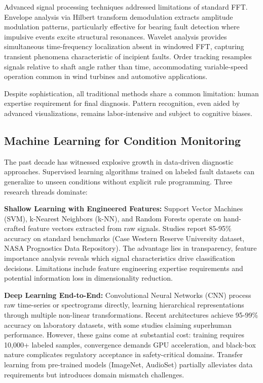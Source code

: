 \documentclass[11pt,a4paper]{article}
\begin{document}
Advanced signal processing techniques addressed limitations of standard FFT. Envelope analysis via Hilbert transform demodulation extracts amplitude modulation patterns, particularly effective for bearing fault detection where impulsive events excite structural resonances. Wavelet analysis provides simultaneous time-frequency localization absent in windowed FFT, capturing transient phenomena characteristic of incipient faults. Order tracking resamples signals relative to shaft angle rather than time, accommodating variable-speed operation common in wind turbines and automotive applications.

Despite sophistication, all traditional methods share a common limitation: human expertise requirement for final diagnosis. Pattern recognition, even aided by advanced visualizations, remains labor-intensive and subject to cognitive biases.

\subsection{Machine Learning for Condition Monitoring}

The past decade has witnessed explosive growth in data-driven diagnostic approaches. Supervised learning algorithms trained on labeled fault datasets can generalize to unseen conditions without explicit rule programming. Three research threads dominate:

\textbf{Shallow Learning with Engineered Features:} Support Vector Machines (SVM), k-Nearest Neighbors (k-NN), and Random Forests operate on hand-crafted feature vectors extracted from raw signals. Studies report 85-95\% accuracy on standard benchmarks (Case Western Reserve University dataset, NASA Prognostics Data Repository). The advantage lies in transparency, feature importance analysis reveals which signal characteristics drive classification decisions. Limitations include feature engineering expertise requirements and potential information loss in dimensionality reduction.

\textbf{Deep Learning End-to-End:} Convolutional Neural Networks (CNN) process raw time-series or spectrograms directly, learning hierarchical representations through multiple non-linear transformations. Recent architectures achieve 95-99\% accuracy on laboratory datasets, with some studies claiming superhuman performance. However, these gains come at substantial cost: training requires 10,000+ labeled samples, convergence demands GPU acceleration, and black-box nature complicates regulatory acceptance in safety-critical domains. Transfer learning from pre-trained models (ImageNet, AudioSet) partially alleviates data requirements but introduces domain mismatch challenges.
\end{document}
